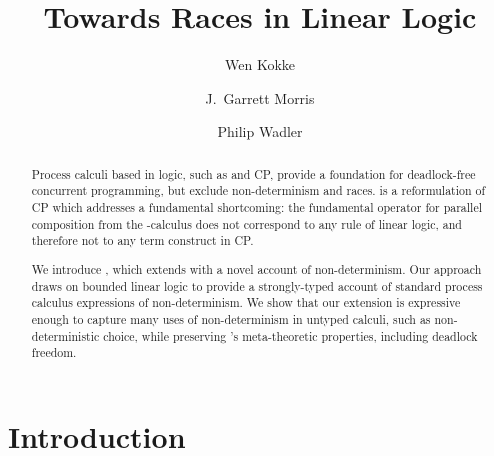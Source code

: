 \documentclass[envcountsame,envcountsect,UKenglish]{llncs}
\title{Towards Races in Linear Logic}
\author{Wen Kokke \and J.\ Garrett Morris \and Philip Wadler}
\institute{University of Edinburgh, Edinburgh, UK,\\
\email{wen.kokke@ed.ac.uk}}
\begin{document}
\maketitle %

\begin{abstract}
  Process calculi based in logic, such as \piDILL and CP, provide a foundation for deadlock-free concurrent programming, but exclude non-determinism and races. \dhcp is a reformulation of CP which addresses a fundamental shortcoming: the fundamental operator for parallel composition from the \textpi-calculus does not correspond to any rule of linear logic, and therefore not to any term construct in CP.

  We introduce \nodcap, which extends \dhcp with a novel account of non-determinism. Our approach draws on bounded linear logic to provide a strongly-typed account of standard process calculus expressions of non-determinism. We show that our extension is expressive enough to capture many uses of non-determinism in untyped calculi, such as non-deterministic choice, while preserving \dhcp's meta-theoretic properties, including deadlock freedom.  
\end{abstract}

\section{Introduction}\label{sec:introduction}
\end{document}
